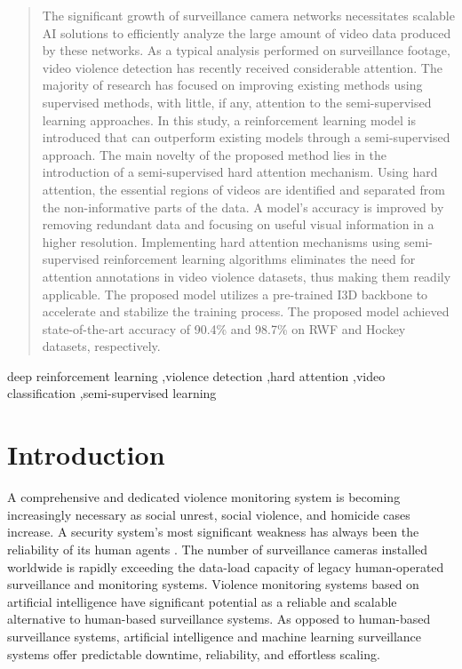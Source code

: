 \documentclass[review]{elsarticle}
\begin{document}
\begin{frontmatter}
\begin{abstract}
{The significant growth of surveillance camera networks necessitates scalable AI solutions to efficiently analyze the large amount of video data produced by these networks. As a typical analysis performed on surveillance footage, video violence detection has recently received considerable attention. The majority of research has focused on improving existing methods using supervised methods, with little, if any, attention to the semi-supervised learning approaches. In this study, a reinforcement learning model is introduced that can outperform existing models through a semi-supervised approach. The main novelty of the proposed method lies in the introduction of a semi-supervised hard attention mechanism. Using hard attention, the essential regions of videos are identified and separated from the non-informative parts of the data. A model's accuracy is improved by removing redundant data and focusing on useful visual information in a higher resolution. Implementing hard attention mechanisms using semi-supervised reinforcement learning algorithms eliminates the need for attention annotations in video violence datasets, thus making them readily applicable. The proposed model utilizes a pre-trained I3D backbone to accelerate and stabilize the training process. The proposed model achieved state-of-the-art accuracy of 90.4\% and 98.7\% on RWF and Hockey datasets, respectively.
}
\end{abstract}

\begin{keyword}
deep reinforcement learning \sep violence detection \sep hard attention \sep video classification \sep semi-supervised learning
\end{keyword}

\end{frontmatter}

\section{Introduction}
\label{Introduction}

A comprehensive and dedicated violence monitoring system is becoming increasingly necessary as social unrest, social violence, and homicide cases increase. A security system's most significant weakness has always been the reliability of its human agents \citep{gill2005assessing, bugeja2018investigation}. The number of surveillance cameras installed worldwide is rapidly exceeding the data-load capacity of legacy human-operated surveillance and monitoring systems\citep{gill2005assessing, bugeja2018investigation}. Violence monitoring systems based on artificial intelligence have significant potential as a reliable and scalable alternative to human-based surveillance systems. As opposed to human-based surveillance systems, artificial intelligence and machine learning surveillance systems offer predictable downtime, reliability, and effortless scaling\citep{nguyen2020artificial, shidik2019systematic, sung2021design}.
\end{document}
